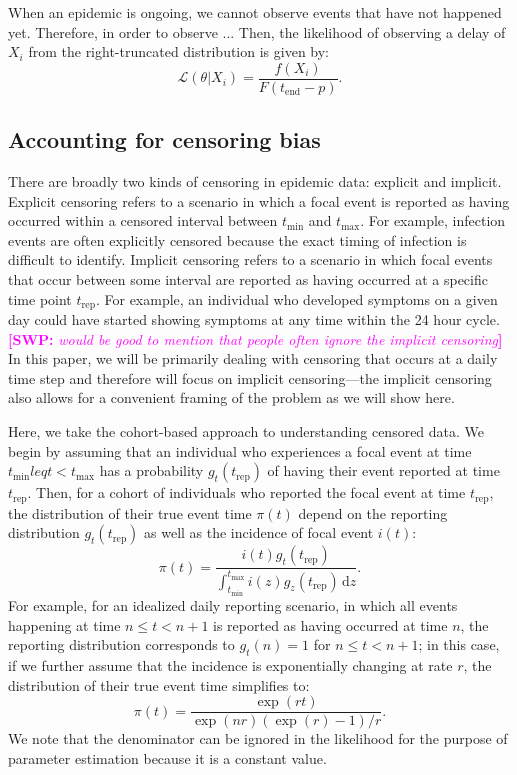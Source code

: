 \documentclass[12pt]{article}
\newcommand{\comment}{\showcomment}
\newcommand{\showcomment}[3]{\textcolor{#1}{\textbf{[#2: }\textsl{#3}\textbf{]}}}
\newcommand{\swp}[1]{\comment{magenta}{SWP}{#1}}
\newcommand{\dd}[1]{\ensuremath{\, \mathrm{d}#1}}
\newcommand{\tend}{{t_{\mathrm{end}}}}
\newcommand{\tmin}{{t_{\mathrm{min}}}}
\newcommand{\tmax}{{t_{\mathrm{max}}}}
\newcommand{\trep}{{t_{\mathrm{rep}}}}
\begin{document}
When an epidemic is ongoing, we cannot observe events that have not happened yet.
Therefore, in order to observe ...
Then, the likelihood of observing a delay of $X_i$ from the right-truncated distribution is given by:
\begin{equation}
\mathcal L(\theta|X_i) = \frac{f(X_i)}{F(\tend-p)}.
\end{equation}

\subsection{Accounting for censoring bias}

There are broadly two kinds of censoring in epidemic data: explicit and implicit.
Explicit censoring refers to a scenario in which a focal event is reported as having occurred within a censored interval between $\tmin$ and $\tmax$.
For example, infection events are often explicitly censored because the exact timing of infection is difficult to identify.
Implicit censoring refers to a scenario in which focal events that occur between some interval are reported as having occurred at a specific time point $\trep$.
For example, an individual who developed symptoms on a given day could have started showing symptoms at any time within the 24 hour cycle.
\swp{would be good to mention that people often ignore the implicit censoring}
In this paper, we will be primarily dealing with censoring that occurs at a daily time step and therefore will focus on implicit censoring---the implicit censoring also allows for a convenient framing of the problem as we will show here.

Here, we take the cohort-based approach to understanding censored data.
We begin by assuming that an individual who experiences a focal event at time $\tmin leq t < \tmax$ has a probability $g_t(\trep)$ of having their event reported at time $\trep$.
Then, for a cohort of individuals who reported the focal event at time $\trep$, the distribution of their true event time $\pi(t)$ depend on the reporting distribution $g_t(\trep)$ as well as the incidence of focal event $i(t)$:
\begin{equation}
\pi(t) = \frac{i(t) g_t(\trep)}{\int_{\tmin}^\tmax i(z) g_z(\trep) \dd z}.
\end{equation}
For example, for an idealized daily reporting scenario, in which all events happening at time $n \leq t < n+1$ is reported as having occurred at time $n$, the reporting distribution corresponds to $g_t(n) = 1$ for $n \leq t < n+1$;
in this case, if we further assume that the incidence is exponentially changing at rate $r$, the distribution of their true event time simplifies to:
\begin{equation}
\pi(t) = \frac{\exp(rt)}{\exp(nr) (\exp(r) - 1)/r}.
\end{equation}
We note that the denominator can be ignored in the likelihood for the purpose of parameter estimation because it is a constant value.
\end{document}
